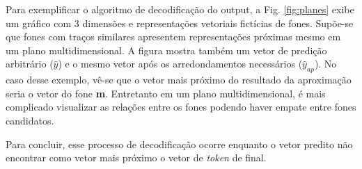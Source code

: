 

Para exemplificar o algoritmo de decodificação do output, a Fig. \ref{fig:planes} exibe um gráfico com 3 dimensões e representações vetoriais fictícias de fones. Supõe-se que fones com traços similares apresentem representações próximas mesmo em um plano multidimensional. A figura mostra também um vetor de predição arbitrário ($\hat{y}$) e o mesmo vetor após os arredondamentos necessários ($\hat{y}_{ap}$). No caso desse exemplo, vê-se que o vetor mais próximo do resultado da aproximação seria o vetor do fone \textbf{m}. Entretanto em um plano multidimensional, é mais complicado visualizar as relações entre os fones podendo haver empate entre fones candidatos. 

Para concluir, esse processo de decodificação ocorre enquanto o vetor predito não encontrar como vetor mais próximo o vetor de \textit{token} de final. 









